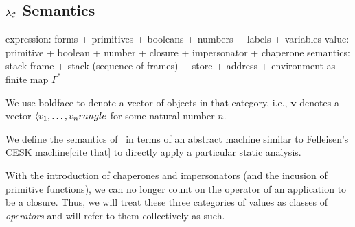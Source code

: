 \documentclass{sigplanconf}
\begin{document}
\newcommand{\impk}[1]{\mathrm{imp}_\kappa(\ell,#1)}
\newcommand{\impcwk}[2]{\mathrm{imp\mhyphen neg\mhyphen ults}_\kappa(\ell,#1,#2)}
\newcommand{\impcfk}[1]{\mathrm{imp\mhyphen fun\mhyphen ults}_\kappa(\ell,#1)}
\newcommand{\impcrk}[1]{\mathrm{imp\mhyphen pos\mhyphen ults}_\kappa(\ell,#1)}


\newcommand{\letk}[3]{\mathrm{let}_\kappa(#1,#2,#3)}
\newcommand{\letreck}[3]{\mathrm{letrec}_\kappa(#1,#2,#3)}


\newcommand{\rr}{\longrightarrow}
\newcommand{\rrs}{\longrightarrow^{*}}

\subsection{$\lambda_{\mathcal{C}}$ Semantics}

expression: forms + primitives + booleans + numbers + labels + variables
value: primitive + boolean + number + closure + impersonator + chaperone
semantics: stack frame + stack (sequence of frames) + store + address + environment as finite map
$\Gamma^{*}$

We use boldface to denote a vector of objects in that category, i.e., $\mathbf{v}$ denotes a vector $\langle v_1,\dots,v_n\\rangle$ for some natural number $n$.

We define the semantics of \chapcalc\ in terms of an abstract machine similar to Felleisen's CESK machine[cite that] to directly apply a particular static analysis.

With the introduction of chaperones and impersonators (and the incusion of primitive functions), we can no longer count on the operator of an application to be a closure.
Thus, we will treat these three categories of values as classes of \emph{operators} and will refer to them collectively as such.
\end{document}
